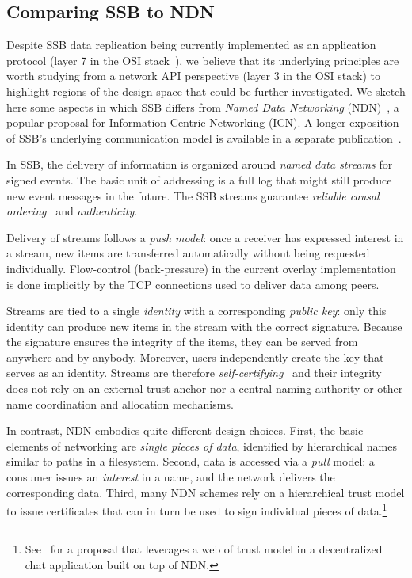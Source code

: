 \documentclass[9pt,sigconf]{acmart}
\begin{document}
\subsection*{Comparing SSB to NDN}

Despite SSB data replication being currently implemented as an
application protocol (layer 7 in the OSI
stack~\cite{briscoe2000understanding}), we believe that its underlying
principles are worth studying from a network API perspective (layer 3
in the OSI stack) to highlight regions of the design space that could
be further investigated. We sketch here some aspects in which SSB
differs from \textit{Named Data Networking}
(NDN)~\cite{ahlgren2012survey}, a popular proposal for
Information-Centric Networking (ICN). A longer exposition of SSB's
underlying communication model is available in a separate
publication~\cite{tschudin2019broadcast}.

In SSB, the delivery of information is organized around \textit{named
  data streams} for signed events. The basic unit of addressing is a
full log that might still produce new event messages in the future.
The SSB streams guarantee \textit{reliable causal
  ordering}~\cite{cachin2011introduction} and \textit{authenticity}.

Delivery of streams follows a \textit{push model}: once a receiver has
expressed interest in a stream, new items are transferred
automatically without being requested individually. Flow-control
(back-pressure) in the current overlay implementation is done
implicitly by the TCP connections used to deliver data among peers.

Streams are tied to a single \textit{identity} with a corresponding
\textit{public key}\/: only this identity can produce new items in the
stream with the correct signature.  Because the signature ensures the
integrity of the items, they can be served from anywhere and by
anybody.
%
Moreover, users independently create the key that serves as an
identity. Streams are therefore
\textit{self-certifying}~\cite{mazieres1998selfcertifyingpathnames}
and their integrity does not rely on an external trust anchor nor a
central naming authority or other name coordination and allocation
mechanisms.

In contrast, NDN embodies quite different design choices. First, the
basic elements of networking are \textit{single pieces of data},
identified by hierarchical names similar to paths in a
filesystem. Second, data is accessed via a \textit{pull} model: a
consumer issues an \textit{interest} in a name, and the network
delivers the corresponding data. Third, many NDN schemes rely on a
hierarchical trust model to issue certificates that can in turn be
used to sign individual pieces of
data.\footnote{See~\cite{zhu2012chronos} for a proposal that leverages
  a web of trust model in a decentralized chat application built on
  top of NDN.}
\end{document}
